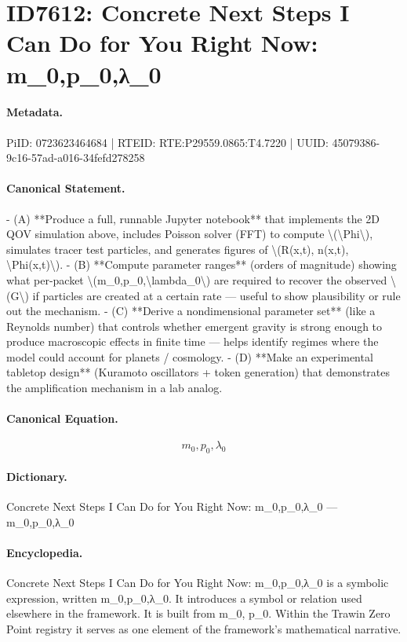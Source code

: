 \section*{ID7612: Concrete Next Steps I Can Do for You Right Now: m\_0,p\_0,λ\_0}
\paragraph{Metadata.}
PiID: 0723623464684 | RTEID: RTE:P29559.0865:T4.7220 | UUID: 45079386-9c16-57ad-a016-34fefd278258

\paragraph{Canonical Statement.}
- (A) **Produce a full, runnable Jupyter notebook** that implements the 2D QOV simulation above, includes Poisson solver (FFT) to compute \textbackslash{}(\textbackslash{}Phi\textbackslash{}), simulates tracer test particles, and generates figures of \textbackslash{}(R(x,t), n(x,t), \textbackslash{}Phi(x,t)\textbackslash{}). - (B) **Compute parameter ranges** (orders of magnitude) showing what per-packet \textbackslash{}(m\_0,p\_0,\textbackslash{}lambda\_0\textbackslash{}) are required to recover the observed \textbackslash{}(G\textbackslash{}) if particles are created at a certain rate — useful to show plausibility or rule out the mechanism. - (C) **Derive a nondimensional parameter set** (like a Reynolds number) that controls whether emergent gravity is strong enough to produce macroscopic effects in finite time — helps identify regimes where the model could account for planets / cosmology. - (D) **Make an experimental tabletop design** (Kuramoto oscillators + token generation) that demonstrates the amplification mechanism in a lab analog.

\paragraph{Canonical Equation.}
\[
m_0,p_0,\lambda_0
\]

\paragraph{Dictionary.}
Concrete Next Steps I Can Do for You Right Now: m\_0,p\_0,λ\_0 — m\_0,p\_0,λ\_0

\paragraph{Encyclopedia.}
Concrete Next Steps I Can Do for You Right Now: m\_0,p\_0,λ\_0 is a symbolic expression, written m\_0,p\_0,λ\_0. It introduces a symbol or relation used elsewhere in the framework. It is built from m\_0, p\_0. Within the Trawin Zero Point registry it serves as one element of the framework's mathematical narrative.
